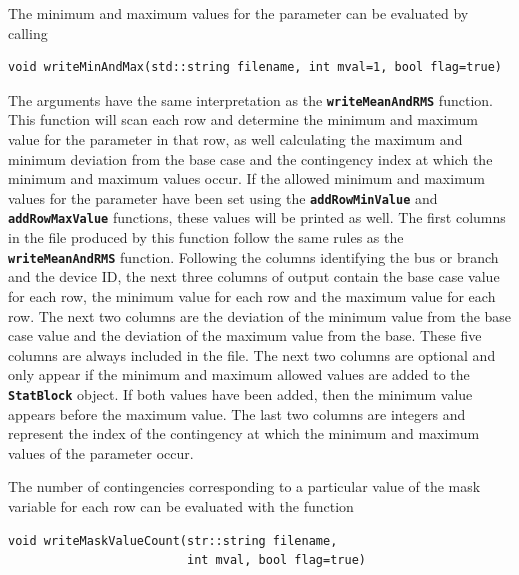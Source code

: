 \documentclass[12pt]{report} %
\begin{document}
The minimum and maximum values for the parameter can be evaluated by calling

{
\color{red}
\begin{Verbatim}[fontseries=b]
void writeMinAndMax(std::string filename, int mval=1, bool flag=true)
\end{Verbatim}
}

The arguments have the same interpretation as the \texttt{\textbf{writeMeanAndRMS}} function. This function will scan each row and determine the minimum and maximum value for the parameter in that row, as well calculating the maximum and minimum deviation from the base case and the contingency index at which the minimum and maximum values occur. If the allowed minimum and maximum values for the parameter have been set using the \texttt{\textbf{addRowMinValue}} and \texttt{\textbf{addRowMaxValue}} functions, these values will be printed as well. The first columns in the file produced by this function follow the same rules as the \texttt{\textbf{writeMeanAndRMS}} function. Following the columns identifying the bus or branch and the device ID, the next three columns of output contain the base case value for each row, the minimum value for each row and the maximum value for each row.  The next two columns are the deviation of the minimum value from the base case value and the deviation of the maximum value from the base. These five columns are always included in the file. The next two columns are optional and only appear if the minimum and maximum allowed values are added to the \texttt{\textbf{StatBlock}} object. If both values have been added, then the minimum value appears before the maximum value. The last two columns are integers and represent the index of the contingency at which the minimum and maximum values of the parameter occur.

The number of contingencies corresponding to a particular value of the mask variable for each row can be evaluated with the function

{
\color{red}
\begin{Verbatim}[fontseries=b]
void writeMaskValueCount(str::string filename,
                         int mval, bool flag=true)
\end{Verbatim}
}
\end{document}
